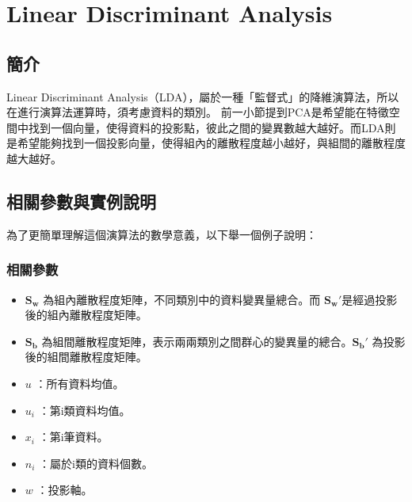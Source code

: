 \chapter{Linear Discriminant Analysis}
\label{chapter:lda}
\section{簡介}
\label{sec:LdaIntroduction}




Linear Discriminant Analysis（LDA），屬於一種「監督式」的降維演算法，所以在進行演算法運算時，須考慮資料的類別。
前一小節提到PCA是希望能在特徵空間中找到一個向量，使得資料的投影點，彼此之間的變異數越大越好。而LDA則是希望能夠找到一個投影向量，使得組內的離散程度越小越好，與組間的離散程度越大越好。




\section{相關參數與實例說明}
為了更簡單理解這個演算法的數學意義，以下舉一個例子說明：


\subsection{相關參數}

\begin{itemize}
	\item
	      \(\mathbf{S_w}\) 為組內離散程度矩陣，不同類別中的資料變異量總合。而 \(\mathbf{{S_w}'}\)是經過投影後的組內離散程度矩陣。
	\item
	      \(\mathbf{S_b}\) 為組間離散程度矩陣，表示兩兩類別之間群心的變異量的總合。\(\mathbf{{S_b}'}\) 為投影後的組間離散程度矩陣。
	\item
	      \(u\) ：所有資料均值。
	\item
	      \(u_i\) ：第i類資料均值。
	\item
	      \(x_i\) ：第i筆資料。
	\item
	      \(n_i\) ：屬於i類的資料個數。
	\item
	      \(w\) ：投影軸。
\end{itemize}

